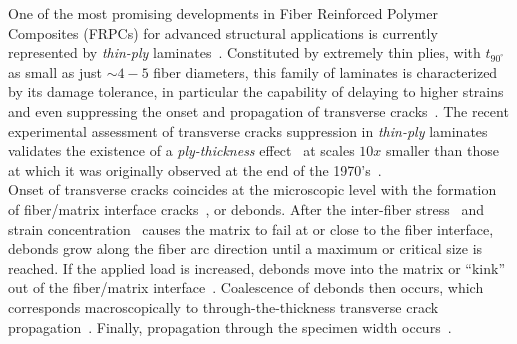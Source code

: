 \documentclass[review]{elsarticle}
\begin{document}
One of the most promising developments in Fiber Reinforced Polymer Composites (FRPCs) for advanced structural applications is currently represented by \emph{thin-ply} laminates~\cite{Kopp2017}. Constituted by extremely thin plies, with $t_{90^{\circ}}$ as small as just $\sim4-5$ fiber diameters, this family of laminates is characterized by its damage tolerance, in particular the capability of delaying to higher strains and even suppressing the onset and propagation of transverse cracks~\cite{Cugnoni2018}. The recent experimental assessment of transverse cracks suppression in \emph{thin-ply} laminates~\cite{Sasayama2003,Saito2012,Amacher2014} validates the existence of a \emph{ply-thickness} effect~\cite{Amacher2014} at scales $10x$ smaller than those at which it was originally observed at the end of the 1970's~\cite{Bailey1979}.\\
Onset of transverse cracks coincides at the microscopic level with the formation of fiber/matrix interface cracks~\cite{Bailey1981}, or debonds. After the inter-fiber stress~\cite{Asp1996} and strain concentration~\cite{Kies1962} causes the matrix to fail at or close to the fiber interface, debonds grow along the fiber arc direction until a maximum or critical size is reached. If the applied load is increased, debonds move into the matrix or ``kink'' out of the fiber/matrix interface~\cite{Zhang1997,Paris2007}. Coalescence of debonds then occurs, which corresponds macroscopically to through-the-thickness transverse crack propagation~\cite{Zhang1997,Zhuang2018b}. Finally, propagation through the specimen width occurs~\cite{Zhang1997}.\\
\end{document}
